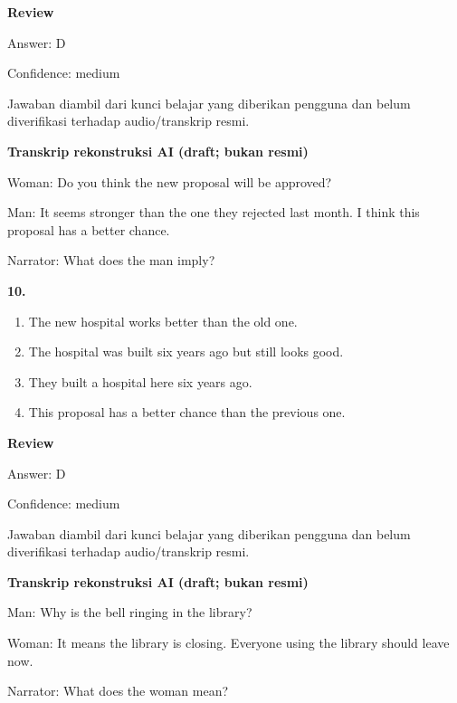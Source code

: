 \documentclass[12pt]{article}
\begin{document}
\begingroup
\setlength{\parskip}{0pt}
\setlength{\parindent}{0pt}
\textbf{Review}\par
Answer: D\par
Confidence: medium\par
Jawaban diambil dari kunci belajar yang diberikan pengguna dan belum diverifikasi terhadap audio/transkrip resmi.\par
\endgroup
\par
\vspace{0.25\baselineskip}
\begin{exampleblock}
\textbf{Transkrip rekonstruksi AI (draft; bukan resmi)}\par
Woman: Do you think the new proposal will be approved?\par
Man: It seems stronger than the one they rejected last month. I think this proposal has a better chance.\par
Narrator: What does the man imply?\par
\end{exampleblock}
\noindent\textbf{10.}
\begin{enumerate}[label=(\Alph*),leftmargin=*,itemsep=0.2em]
\item The new hospital works better than the old one.
\item The hospital was built six years ago but still looks good.
\item They built a hospital here six years ago.
\item This proposal has a better chance than the previous one.
\end{enumerate}
\par
\begingroup
\setlength{\parskip}{0pt}
\setlength{\parindent}{0pt}
\textbf{Review}\par
Answer: D\par
Confidence: medium\par
Jawaban diambil dari kunci belajar yang diberikan pengguna dan belum diverifikasi terhadap audio/transkrip resmi.\par
\endgroup
\par
\vspace{0.25\baselineskip}
\begin{exampleblock}
\textbf{Transkrip rekonstruksi AI (draft; bukan resmi)}\par
Man: Why is the bell ringing in the library?\par
Woman: It means the library is closing. Everyone using the library should leave now.\par
Narrator: What does the woman mean?\par
\end{exampleblock}
\end{document}
